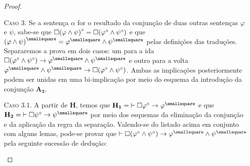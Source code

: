 \begin{theorem}
\begin{proof}
        \begin{case}
            \textsc{Caso 3.}
            Se a sentença $\alpha$ for o resultado da conjunção de duas outras sentenças $\varphi$ e $\psi$, sabe-se que $\mathord{\square}{(\varphi\wedge\psi)}^\circ=\mathord{\square}(\varphi^\circ\wedge\psi^\circ)$ e que ${(\varphi\wedge\psi)}^\smallsquare=\varphi^\smallsquare\wedge\psi^\smallsquare$ pelas definições das traduções.
            Separaremos a prova em dois casos: um para a ida $\nec(\varphi^\circ\wedge\psi^\circ)\to\varphi^\smallsquare\wedge\psi^\smallsquare$ e outro para a volta $\varphi^\smallsquare\wedge\psi^\smallsquare\to\nec(\varphi^\circ\wedge\psi^\circ)$. Ambas as implicações posteriormente podem ser unidas em uma bi-implicação por meio do esquema da introdução da conjunção \hyperref[MA3]{$\mathbf{A_3}$}.
        \end{case}

            \begin{subcase}
                \textsc{Caso 3.1.}
                A partir de $\mathbf{H}$, temos que $\mathbf{H_1}={\entails\nec\varphi^\circ\to\varphi^\smallsquare}$ e que $\mathbf{H_2}={\entails\nec\psi^\circ\to\psi^\smallsquare}$ por meio dos esquemas da eliminação da conjunção e da aplicação da regra da separação.
                Valendo-se do listado acima em conjunto com alguns lemas, pode-se provar que $\entails\nec(\varphi^\circ\wedge\psi^\circ)\to\varphi^\smallsquare\wedge\psi^\smallsquare$ pela seguinte sucessão de dedução:


\end{subcase}
\end{proof}
\end{theorem}
